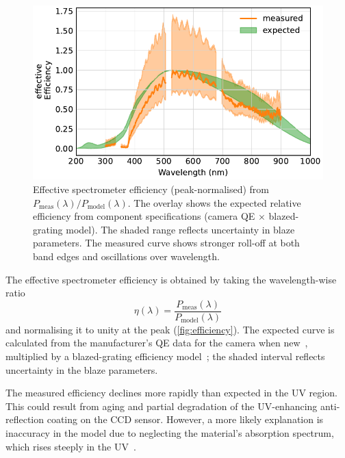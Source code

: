 \documentclass[
	parskip=half,
	a4paper,
]{scrarticle}
\begin{document}
\begin{figure}
    \centering
    \includegraphics{../analysis/figures/efficiency de.pdf}
    \caption{Effective spectrometer efficiency (peak-normalised) from \(P_{\text{meas}}(\lambda)/P_{\text{model}}(\lambda)\). The overlay shows the expected relative efficiency from component specifications (camera QE \(\times\) blazed-grating model). The shaded range reflects uncertainty in blaze parameters. The measured curve shows stronger roll-off at both band edges and oscillations over wavelength.}
    \label{fig:efficiency}
\end{figure}
The effective spectrometer efficiency is obtained by taking the wavelength-wise ratio
\[
\eta(\lambda) = \frac{P_{\text{meas}}(\lambda)}{P_{\text{model}}(\lambda)}
\]
and normalising it to unity at the peak (\autoref{fig:efficiency}). The expected curve is calculated from the manufacturer’s QE data for the camera when new~\cite{andor_ixonem_nodate}, multiplied by a blazed-grating efficiency model~\cite{barker_ripple_1984}; the shaded interval reflects uncertainty in the blaze parameters.  

The measured efficiency declines more rapidly than expected in the UV region. This could result from aging and partial degradation of the UV-enhancing anti-reflection coating on the CCD sensor. However, a more likely explanation is inaccuracy in the model due to neglecting the material’s absorption spectrum, which rises steeply in the UV~\cite{smausz_determination_2017}.
\end{document}

